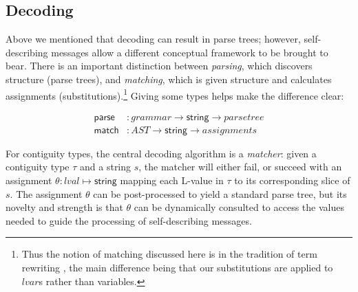 \documentclass[sigplan,10pt,anonymous,review]{acmart}\settopmatter{printfolios=true,printccs=false,printacmref=false}
\newcommand{\konst}[1]{\ensuremath{\mathsf{#1}}}
\begin{document}
\subsection{Decoding}
\label{decoding}

Above we mentioned that decoding can result in parse trees; however,
self-describing messages allow a different conceptual framework to be
brought to bear. There is an important distinction between
\emph{parsing}, which discovers structure (parse trees), and
\emph{matching}, which is given structure and calculates assignments
(substitutions).\footnote{Thus the notion of matching discussed here
  is in the tradition of term rewriting \cite{nipkow-trs-book}, the
  main difference being that our substitutions are applied to
  $\mathit{lvar}$s rather than variables.} Giving some types helps
make the difference clear:

\begin{align*}
  \konst{parse} &: \mathit{grammar} \to \konst{string} \to \mathit{parse tree} \\
  \konst{match} &: \mathit{AST} \to \konst{string} \to \mathit{assignments}
\end{align*}

For contiguity types, the central decoding algorithm is a
\emph{matcher}: given a contiguity type $\tau$ and a string $s$, the
matcher will either fail, or succeed with an assignment $\theta :
\mathit{lval} \mapsto \konst{string}$ mapping each L-value in $\tau$
to its corresponding slice of $s$. The assignment $\theta$ can be
post-processed to yield a standard parse tree, but its novelty and
strength is that $\theta$ can be dynamically consulted to access the
values needed to guide the processing of self-describing messages.
\end{document}

